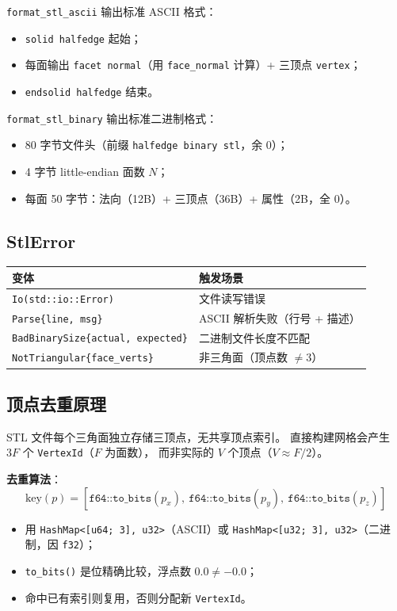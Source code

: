 \documentclass[11pt,a4paper]{article}
\begin{document}
\texttt{format\_stl\_ascii} 输出标准 ASCII 格式：
\begin{itemize}
  \item \texttt{solid halfedge} 起始；
  \item 每面输出 \texttt{facet normal}（用 \texttt{face\_normal} 计算）+
        三顶点 \texttt{vertex}；
  \item \texttt{endsolid halfedge} 结束。
\end{itemize}

\texttt{format\_stl\_binary} 输出标准二进制格式：
\begin{itemize}
  \item 80 字节文件头（前缀 \texttt{halfedge binary stl}，余 0）；
  \item 4 字节 little-endian 面数 $N$；
  \item 每面 50 字节：法向（12B）+ 三顶点（36B）+ 属性（2B，全 0）。
\end{itemize}

\subsection{StlError}

\begin{center}
\renewcommand{\arraystretch}{1.18}
\begin{tabular}{@{}ll@{}}
  \toprule
  \textbf{变体} & \textbf{触发场景} \\
  \midrule
  \texttt{Io(std::io::Error)}                       & 文件读写错误 \\
  \texttt{Parse\{line, msg\}}                       & ASCII 解析失败（行号 + 描述） \\
  \texttt{BadBinarySize\{actual, expected\}}        & 二进制文件长度不匹配 \\
  \texttt{NotTriangular\{face\_verts\}}             & 非三角面（顶点数 $\ne 3$） \\
  \bottomrule
\end{tabular}
\end{center}

\subsection{顶点去重原理}

STL 文件每个三角面独立存储三顶点，无共享顶点索引。
直接构建网格会产生 $3F$ 个 \texttt{VertexId}（$F$ 为面数），
而非实际的 $V$ 个顶点（$V \approx F/2$）。

\textbf{去重算法}：
\[
  \text{key}(p) = [\texttt{f64::to\_bits}(p_x),\ \texttt{f64::to\_bits}(p_y),\ \texttt{f64::to\_bits}(p_z)]
\]
\begin{itemize}
  \item 用 \texttt{HashMap<[u64; 3], u32>}（ASCII）或
        \texttt{HashMap<[u32; 3], u32>}（二进制，因 \texttt{f32}）；
  \item \texttt{to\_bits()} 是位精确比较，浮点数 $0.0 \ne -0.0$；
  \item 命中已有索引则复用，否则分配新 \texttt{VertexId}。
\end{itemize}
\end{document}

